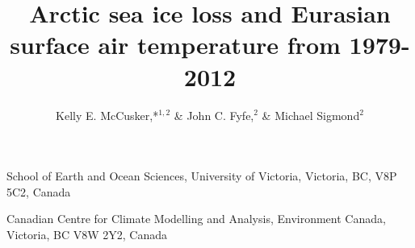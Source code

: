 \documentclass{nature}
\title{Arctic sea ice loss and Eurasian surface air temperature from 1979-2012}
\author{Kelly E. McCusker,*$^{1,2}$ \& John C. Fyfe,$^{2}$ \& Michael Sigmond$^2$}
\begin{document}
\maketitle

\begin{affiliations}
 \item School of Earth and Ocean Sciences, University of Victoria, Victoria, BC, V8P 5C2, Canada
 \item Canadian Centre for Climate Modelling and Analysis, Environment Canada, Victoria, BC V8W 2Y2, Canada
\end{affiliations}


\begin{abstract}

\end{abstract}
\end{document}
